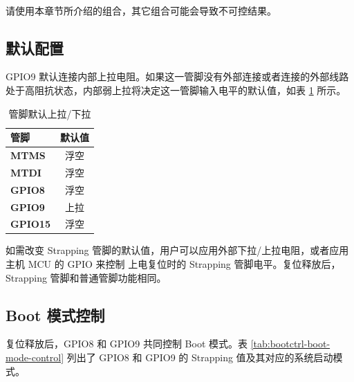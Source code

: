 \documentclass[main\_\_CN.tex]{subfiles}
\begin{document}
\begin{importantlisting}\\
请使用本章节所介绍的组合，其它组合可能会导致不可控结果。
\end{importantlisting}

\subsection{默认配置}

GPIO9 默认连接内部上拉电阻。如果这一管脚没有外部连接或者连接的外部线路处于高阻抗状态，内部弱上拉将决定这一管脚输入电平的默认值，如表 \ref{tab:bootctrl-default-config-strapping-pins} 所示。

\clearpage
\begin{longtable}[c]{|p{1.5cm}|c|}
\caption{管脚默认上拉/下拉}
\label{tab:bootctrl-default-config-strapping-pins} \\
    \hline
    \rowcolor{lightgray}
  \textbf{管脚} & \textbf{默认值} \\ \hline
  \textbf{MTMS} & 浮空 \\ \hline
  \textbf{MTDI} & 浮空 \\ \hline
  \textbf{GPIO8} & 浮空 \\ \hline
  \textbf{GPIO9} & 上拉 \\ \hline
  \textbf{GPIO15} & 浮空 \\ \hline
\end{longtable}

如需改变 Strapping 管脚的默认值，用户可以应用外部下拉/上拉电阻，或者应用主机 MCU 的 GPIO 来控制 \chipname{} 上电复位时的 Strapping 管脚电平。复位释放后，Strapping 管脚和普通管脚功能相同。


\subsection{Boot 模式控制}

复位释放后，GPIO8 和 GPIO9 共同控制 Boot 模式。表 \ref{tab:bootctrl-boot-mode-control} 列出了 GPIO8 和 GPIO9 的 Strapping 值及其对应的系统启动模式。
\end{document}
